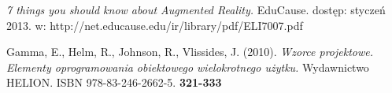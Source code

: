 \begin{thebibliography}{}

  \emph{7 things you should know about Augmented Reality.}
              EduCause.
              dostęp: styczeń 2013.
              w: http://net.educause.edu/ir/library/pdf/ELI7007.pdf
 
  Gamma, E., Helm, R., Johnson, R., Vlissides, J.
                            (2010).
                            \emph{Wzorce projektowe. Elementy oprogramowania obiektowego wielokrotnego użytku.}
                            Wydawnictwo HELION.
                            ISBN 978-83-246-2662-5.
                            \textbf{321-333}
                
\end{thebibliography}
